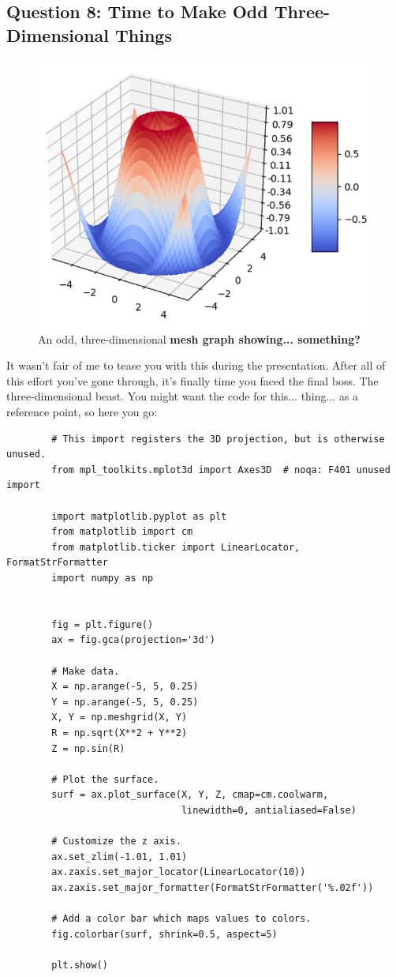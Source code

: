 \documentclass{article}
\begin{document}
    \subsection{Question 8: Time to Make Odd Three-Dimensional Things}
    \begin{figure}[H]
        \centering
        \includegraphics[width=\linewidth]{../figures/odd-3d-thing}
        \caption{An odd, three-dimensional \bfseries mesh graph \mdseries showing... something?}
        \label{odd-3d-graph}
    \end{figure}
    It wasn't fair of me to tease you with this during the presentation. After all of this effort you've gone through, it's finally time you faced the final boss. The three-dimensional beast.
    You might want the code for this... thing... as a reference point, so here you go:
    \newpage
    \begin{lstlisting}
        # This import registers the 3D projection, but is otherwise unused.
        from mpl_toolkits.mplot3d import Axes3D  # noqa: F401 unused import
        
        import matplotlib.pyplot as plt
        from matplotlib import cm
        from matplotlib.ticker import LinearLocator, FormatStrFormatter
        import numpy as np
        
        
        fig = plt.figure()
        ax = fig.gca(projection='3d')
        
        # Make data.
        X = np.arange(-5, 5, 0.25)
        Y = np.arange(-5, 5, 0.25)
        X, Y = np.meshgrid(X, Y)
        R = np.sqrt(X**2 + Y**2)
        Z = np.sin(R)
        
        # Plot the surface.
        surf = ax.plot_surface(X, Y, Z, cmap=cm.coolwarm,
                               linewidth=0, antialiased=False)
        
        # Customize the z axis.
        ax.set_zlim(-1.01, 1.01)
        ax.zaxis.set_major_locator(LinearLocator(10))
        ax.zaxis.set_major_formatter(FormatStrFormatter('%.02f'))
        
        # Add a color bar which maps values to colors.
        fig.colorbar(surf, shrink=0.5, aspect=5)
        
        plt.show()        
    \end{lstlisting}
\end{document}
